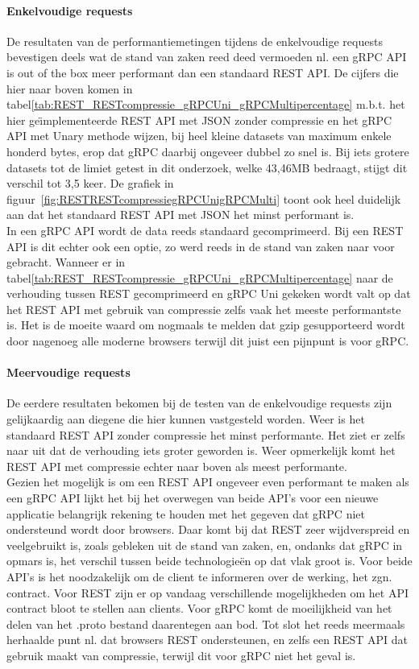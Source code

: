 \paragraph{Enkelvoudige requests}
De resultaten van de performantiemetingen tijdens de enkelvoudige requests bevestigen deels wat de stand van zaken reed deed vermoeden nl. een gRPC API is out of the box
meer performant dan een standaard REST API. De cijfers die hier naar boven komen in tabel\ref{tab:REST_RESTcompressie_gRPCUni_gRPCMultipercentage} m.b.t.
het hier ge\"{\i}mplementeerde REST API met JSON zonder compressie en het gRPC API met Unary methode wijzen, bij heel kleine datasets van maximum enkele honderd bytes, erop dat gRPC
daarbij ongeveer dubbel zo snel is. Bij iets grotere datasets tot de limiet getest in dit onderzoek, welke 43,46MB bedraagt, stijgt dit verschil tot 3,5 keer.
De grafiek in figuur~\ref{fig:RESTRESTcompressiegRPCUnigRPCMulti} toont ook heel duidelijk aan dat het standaard REST API met JSON het minst performant is.\\
In een gRPC API wordt de data reeds standaard gecomprimeerd. Bij een REST API is dit echter ook een optie, zo werd reeds in de stand van zaken naar voor gebracht. Wanneer er
in tabel\ref{tab:REST_RESTcompressie_gRPCUni_gRPCMultipercentage} naar de verhouding tussen REST gecomprimeerd en gRPC Uni gekeken wordt valt op dat het REST API met gebruik van compressie
zelfs vaak het meeste performantste is. Het is de moeite waard om nogmaals te melden dat gzip gesupporteerd wordt door nagenoeg alle moderne browsers terwijl dit juist een pijnpunt is voor gRPC.\\

\paragraph{Meervoudige requests}
De eerdere resultaten bekomen bij de testen van de enkelvoudige requests zijn gelijkaardig aan diegene die hier kunnen vastgesteld worden. Weer is het standaard
REST API zonder compressie het minst performante. Het ziet er zelfs naar uit dat de verhouding iets groter geworden is. Weer opmerkelijk komt het REST API
met compressie echter naar boven als meest performante.\\

Gezien het mogelijk is om een REST API ongeveer even performant te maken als een gRPC API lijkt het bij het overwegen van beide API's voor een nieuwe applicatie
belangrijk rekening te houden met het gegeven dat gRPC niet ondersteund wordt door browsers. Daar komt bij dat REST zeer wijdverspreid en veelgebruikt is, zoals gebleken
uit de stand van zaken, en, ondanks dat gRPC in opmars is, het verschil tussen beide technologie\"en op dat vlak groot is. Voor beide API's is het noodzakelijk om
de client te informeren over de werking, het zgn. contract. Voor REST zijn er op vandaag verschillende mogelijkheden om het API contract bloot te stellen aan clients.
Voor gRPC komt de moeilijkheid van het delen van het .proto bestand daarentegen aan bod. Tot slot het reeds meermaals herhaalde punt nl. dat browsers REST ondersteunen, en zelfs
een REST API dat gebruik maakt van compressie, terwijl dit voor gRPC niet het geval is.

